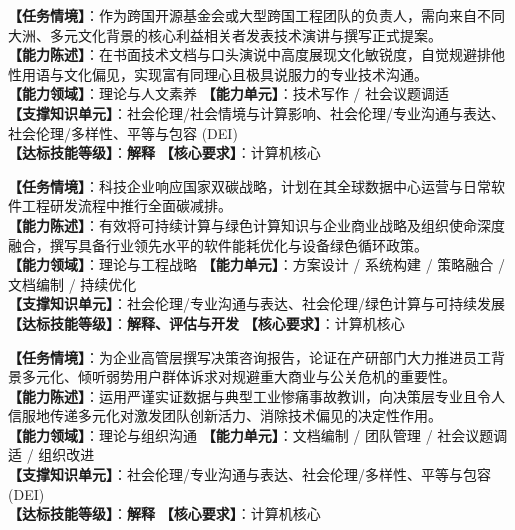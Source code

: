 \begin{taskbox}[任务 7：在技术写作与口头汇报中展现敏锐的文化意识与文化能力]
\textbf{【任务情境】}：作为跨国开源基金会或大型跨国工程团队的负责人，需向来自不同大洲、多元文化背景的核心利益相关者发表技术演讲与撰写正式提案。\\
\textbf{【能力陈述】}：在书面技术文档与口头演说中高度展现文化敏锐度，自觉规避排他性用语与文化偏见，实现富有同理心且极具说服力的专业技术沟通。\\
\textbf{【能力领域】}：理论与人文素养 \quad \textbf{【能力单元】}：技术写作 / 社会议题调适\\
\textbf{【支撑知识单元】}：社会伦理/社会情境与计算影响、社会伦理/专业沟通与表达、社会伦理/多样性、平等与包容 (DEI)\\
\textbf{【达标技能等级】}：\textbf{解释} \quad \textbf{【核心要求】}：计算机核心
\end{taskbox}

\begin{taskbox}[任务 8：参与制定企业或研发团队的可持续发展与绿色低碳政策]
\textbf{【任务情境】}：科技企业响应国家双碳战略，计划在其全球数据中心运营与日常软件工程研发流程中推行全面碳减排。\\
\textbf{【能力陈述】}：有效将可持续计算与绿色计算知识与企业商业战略及组织使命深度融合，撰写具备行业领先水平的软件能耗优化与设备绿色循环政策。\\
\textbf{【能力领域】}：理论与工程战略 \quad \textbf{【能力单元】}：方案设计 / 系统构建 / 策略融合 / 文档编制 / 持续优化\\
\textbf{【支撑知识单元】}：社会伦理/专业沟通与表达、社会伦理/绿色计算与可持续发展\\
\textbf{【达标技能等级】}：\textbf{解释、评估与开发} \quad \textbf{【核心要求】}：计算机核心
\end{taskbox}

\begin{taskbox}[任务 9：阐释研发团队与用户多元化对企业创新与系统质量的深远收益及同质化危害]
\textbf{【任务情境】}：为企业高管层撰写决策咨询报告，论证在产研部门大力推进员工背景多元化、倾听弱势用户群体诉求对规避重大商业与公关危机的重要性。\\
\textbf{【能力陈述】}：运用严谨实证数据与典型工业惨痛事故教训，向决策层专业且令人信服地传递多元化对激发团队创新活力、消除技术偏见的决定性作用。\\
\textbf{【能力领域】}：理论与组织沟通 \quad \textbf{【能力单元】}：文档编制 / 团队管理 / 社会议题调适 / 组织改进\\
\textbf{【支撑知识单元】}：社会伦理/专业沟通与表达、社会伦理/多样性、平等与包容 (DEI)\\
\textbf{【达标技能等级】}：\textbf{解释} \quad \textbf{【核心要求】}：计算机核心
\end{taskbox}

